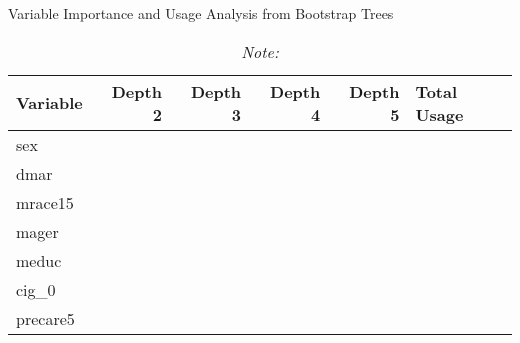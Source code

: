 \begin{table}[htbp]
\centering
\caption{Variable Importance and Usage Analysis from Bootstrap Trees}
\label{tab:var-across-depths}
\begin{tabular}{lrrrr}
\hline
Variable & Depth 2 & Depth 3 & Depth 4 & Depth 5 & Total Usage \\
\hline
sex &  &  &  &  &  \\ 
dmar &  &  &  &  &  \\ 
mrace15 &  &  &  &  &  \\ 
mager &  &  &  &  &  \\ 
meduc &  &  &  &  &  \\ 
cig_0 &  &  &  &  &  \\ 
precare5 &  &  &  &  &  \\ 
\hline
\end{tabular}
\caption*{\textit{Note:}}
\end{table}
